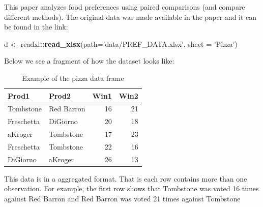 \documentclass[
]{book}
\newenvironment{Shaded}{\begin{snugshade}}{\end{snugshade}}
\newcommand{\DataTypeTok}[1]{\textcolor[rgb]{0.13,0.29,0.53}{#1}}
\newcommand{\DecValTok}[1]{\textcolor[rgb]{0.00,0.00,0.81}{#1}}
\newcommand{\KeywordTok}[1]{\textcolor[rgb]{0.13,0.29,0.53}{\textbf{#1}}}
\newcommand{\NormalTok}[1]{#1}
\newcommand{\OperatorTok}[1]{\textcolor[rgb]{0.81,0.36,0.00}{\textbf{#1}}}
\newcommand{\StringTok}[1]{\textcolor[rgb]{0.31,0.60,0.02}{#1}}
\begin{document}
This paper analyzes food preferences using paired comparisons (and compare different methods). The original data was made available in the paper and it can be found in the link:

\begin{Shaded}
\begin{Highlighting}[]
\NormalTok{d <-}\StringTok{ }\NormalTok{readxl}\OperatorTok{::}\KeywordTok{read_xlsx}\NormalTok{(}\DataTypeTok{path=}\StringTok{'data/PREF_DATA.xlsx'}\NormalTok{, }\DataTypeTok{sheet =} \StringTok{'Pizza'}\NormalTok{)}
\end{Highlighting}
\end{Shaded}

Below we see a fragment of how the dataset looks like:

\begin{Shaded}
\end{Shaded}

\begin{table}

\caption{\label{tab:unnamed-chunk-7}Example of the pizza data frame}
\centering
\begin{tabular}[t]{l|l|r|r}
\hline
Prod1 & Prod2 & Win1 & Win2\\
\hline
Tombstone & Red Barron & 16 & 21\\
\hline
Freschetta & DiGiorno & 20 & 18\\
\hline
aKroger & Tombstone & 17 & 23\\
\hline
Freschetta & Tombstone & 22 & 16\\
\hline
DiGiorno & aKroger & 26 & 13\\
\hline
\end{tabular}
\end{table}

This data is in a aggregated format. That is each row contains more than one observation. For example, the first row shows that Tombstone was voted 16 times against Red Barron and Red Barron was voted 21 times against Tombstone
\end{document}
